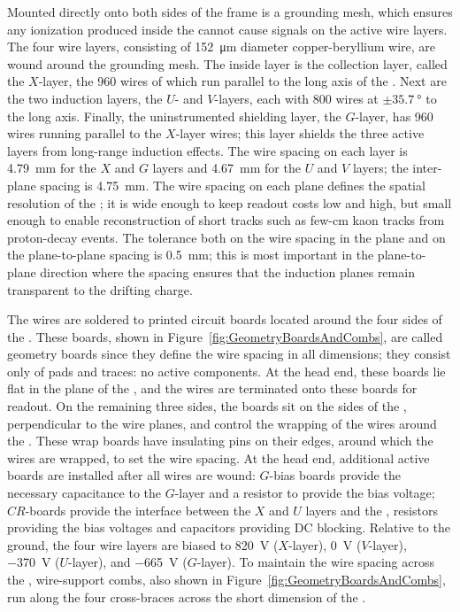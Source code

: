 Mounted directly onto both sides of the  frame is a grounding mesh, which ensures any ionization produced inside the  cannot cause signals on the active wire layers. The four wire layers, consisting of \SI{152}{\micro\meter} diameter copper-beryllium wire, are wound around the grounding mesh. The inside layer is the collection layer, called the $X$-layer, the 960 wires of which run parallel to the long axis of the . Next are the two induction layers, the $U$- and $V$-layers, each with 800 wires at $\pm\SI{35.7}{\degree}$ to the long axis. Finally, the uninstrumented shielding layer, the $G$-layer, has 960 wires running parallel to the $X$-layer wires; this layer shields the three active layers from long-range induction effects. The wire spacing on each layer is \SI{4.79}{\mm} for the $X$ and $G$ layers and \SI{4.67}{\mm} for the $U$ and $V$ layers; the inter-plane spacing is \SI{4.75}{\mm}. The wire spacing on each plane defines the spatial resolution of the ; it is wide enough to keep readout costs low and  high, but small enough to enable reconstruction of short tracks such as few-\si{\cm} kaon tracks from proton-decay events. The tolerance both on the wire spacing in the plane and on the plane-to-plane spacing is \SI{0.5}{\mm}; this is most important in the plane-to-plane direction where the spacing ensures that the induction planes remain transparent to the drifting charge.

The wires are soldered to printed circuit boards located around the four sides of the . These boards, shown in Figure~\ref{fig:GeometryBoardsAndCombs}, are called geometry boards since they define the wire spacing in all dimensions; they consist only of pads and traces: no active components. At the head end, these boards lie flat in the plane of the , and the wires are terminated onto these boards for readout. On the remaining three sides, the boards sit on the sides of the , perpendicular to the wire planes, and control the wrapping of the wires around the . These wrap boards have insulating pins on their edges, around which the wires are wrapped, to set the wire spacing. At the head end, additional active boards are installed after all wires are wound: $G$-bias boards provide the necessary capacitance to the $G$-layer and a resistor to provide the bias voltage; $CR$-boards provide the interface between the $X$ and $U$ layers and the , resistors providing the bias voltages and capacitors providing DC blocking. Relative to the ground, the four wire layers are biased to \SI{820}{\volt} ($X$-layer), \SI{0}{\volt} ($V$-layer), \SI{-370}{\volt} ($U$-layer), and \SI{-665}{\volt} ($G$-layer). To maintain the wire spacing across the , wire-support combs, also shown in Figure~\ref{fig:GeometryBoardsAndCombs}, run along the four cross-braces across the short dimension of the .


